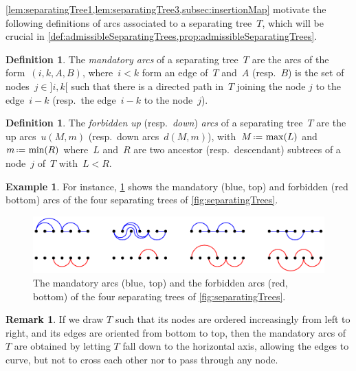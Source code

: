 \documentclass{amsart}
\theoremstyle{definition}
\newtheorem{definition}[theorem]{Definition}
\newtheorem{example}[theorem]{Example}
\newtheorem{remark}[theorem]{Remark}
\newcommand{\eqdef}{\mbox{\,\raisebox{0.2ex}{\scriptsize\ensuremath{\mathrm:}}\ensuremath{=}\,}} %
\newcommand{\darkblue}{\color{darkblue}} %
\newcommand{\defn}[1]{\textsl{\darkblue #1}} %
\begin{document}
\cref{lem:separatingTree1,lem:separatingTree3,subsec:insertionMap} motivate the following definitions of arcs associated to a separating tree~$T$, which will be crucial in \cref{def:admissibleSeparatingTrees,prop:admissibleSeparatingTrees}.

\begin{definition}
\label{def:mandatoryArcsSeparatingTree}
The \defn{mandatory arcs} of a separating tree~$T$ are the arcs of the form~$(i, k, A, B)$, where~$i < k$ form an edge of~$T$ and~$A$ (resp.~$B$) is the set of nodes~$j \in {]i,k[}$ such that there is a directed path in~$T$ joining the node $j$ to the edge~$i-k$ (resp.~the edge~$i-k$ to the node~$j$).
\end{definition}

\begin{definition}
\label{def:forbiddenArcsSeparatingTree}
The \defn{forbidden up} (resp.~\defn{down}) \defn{arcs} of a separating tree~$T$ are the up arcs~$u(M, m)$ (resp.~down arcs~$d(M, m)$), with~$M \eqdef \max(L)$ and~$m \eqdef \min(R)$ where~$L$ and~$R$ are two ancestor (resp.~descendant) subtrees of a node~$j$ of~$T$ with~$L < R$.
\end{definition}

\begin{example}
For instance, \cref{fig:mandatoryForbiddenArcsSeparatingTrees} shows the mandatory (blue, top) and forbidden (red bottom) arcs of the four separating trees of \cref{fig:separatingTrees}.
\begin{figure}
	\capstart
	\centerline{\includegraphics[scale=.85]{mandatoryForbiddenArcsSeparatingTrees}}
	\caption{The mandatory arcs (blue, top) and the forbidden arcs (red, bottom) of the four separating trees of \cref{fig:separatingTrees}.}
	\label{fig:mandatoryForbiddenArcsSeparatingTrees}
\end{figure}
\end{example}

\begin{remark}
\label{rem:separatingTreeFallHorizontalAxis}
If we draw $T$ such that its nodes are ordered increasingly from left to right, and its edges are oriented from bottom to top, then the mandatory arcs of~$T$ are obtained by letting $T$ fall down to the horizontal axis, allowing the edges to curve, but not to cross each other nor to pass through any node.
\end{remark}
\end{document}
